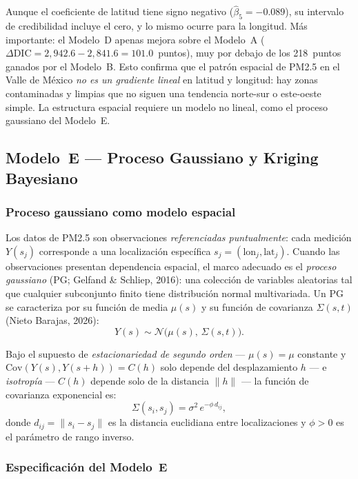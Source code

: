 ﻿\documentclass[12pt]{article}
\begin{document}
Aunque el coeficiente de latitud tiene signo negativo
($\hat\beta_5 = -0.089$), su intervalo de credibilidad incluye el cero,
y lo mismo ocurre para la longitud.
M\'as importante: el Modelo~D apenas mejora sobre el Modelo~A
($\Delta\text{DIC} = 2{,}942.6 - 2{,}841.6 = 101.0$~puntos),
muy por debajo de los 218~puntos ganados por el Modelo~B.
Esto confirma que el patr\'on espacial de PM2.5 en el Valle de M\'exico
\emph{no es un gradiente lineal} en latitud y longitud: hay zonas
contaminadas y limpias que no siguen una tendencia norte-sur o este-oeste
simple.
La estructura espacial requiere un modelo no lineal, como el proceso
gaussiano del Modelo~E.


\subsection{Modelo~E --- Proceso Gaussiano y Kriging Bayesiano}

\subsubsection*{Proceso gaussiano como modelo espacial}

Los datos de PM2.5 son observaciones \emph{referenciadas puntualmente}:
cada medici\'on $Y(s_j)$ corresponde a una localizaci\'on espec\'ifica
$s_j = (\text{lon}_j, \text{lat}_j)$.
Cuando las observaciones presentan dependencia espacial, el marco adecuado
es el \emph{proceso gaussiano} (PG; Gelfand \& Schliep, 2016): una colecci\'on de variables aleatorias
tal que cualquier subconjunto finito tiene distribuci\'on normal multivariada.
Un PG se caracteriza por su funci\'on de media $\mu(s)$ y su funci\'on de
covarianza $\Sigma(s, t)$ (Nieto Barajas, 2026):
\[
  Y(s) \sim \mathcal{N}\!\bigl(\mu(s),\,\Sigma(s,t)\bigr).
\]

Bajo el supuesto de \emph{estacionariedad de segundo orden} ---
$\mu(s) = \mu$ constante y $\text{Cov}(Y(s), Y(s+h)) = C(h)$ solo depende
del desplazamiento $h$ --- e \emph{isotrop\'ia} --- $C(h)$ depende solo de
la distancia $\|h\|$ --- la funci\'on de covarianza exponencial es:
\[
  \Sigma(s_i, s_j) = \sigma^2\, e^{-\phi\, d_{ij}},
\]
donde $d_{ij} = \|s_i - s_j\|$ es la distancia euclidiana entre
localizaciones y $\phi > 0$ es el par\'ametro de rango inverso.

\subsubsection*{Especificaci\'on del Modelo~E}
\end{document}
